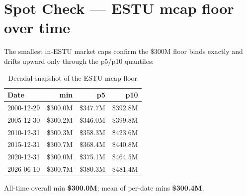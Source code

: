 \documentclass[11pt,a4paper]{article}
\begin{document}
\section{Spot Check --- ESTU mcap floor over time}

The smallest in-ESTU market caps confirm the \$300M floor binds exactly and
drifts upward only through the p5/p10 quantiles:

\begin{table}[h!]
\centering
\caption{Decadal snapshot of the ESTU mcap floor}
\small
\begin{tabular}{lrrr}
\toprule
\textbf{Date} & \textbf{min} & \textbf{p5} & \textbf{p10} \\
\midrule
2000-12-29 & \$300.0M & \$347.7M & \$392.8M \\
2005-12-30 & \$300.2M & \$346.0M & \$399.8M \\
2010-12-31 & \$300.3M & \$358.3M & \$423.6M \\
2015-12-31 & \$300.7M & \$368.4M & \$440.8M \\
2020-12-31 & \$300.0M & \$375.1M & \$464.5M \\
2026-06-10 & \$300.7M & \$380.3M & \$481.4M \\
\bottomrule
\end{tabular}
\end{table}

All-time overall min \textbf{\$300.0M}; mean of per-date mins \textbf{\$300.4M}.
\end{document}
